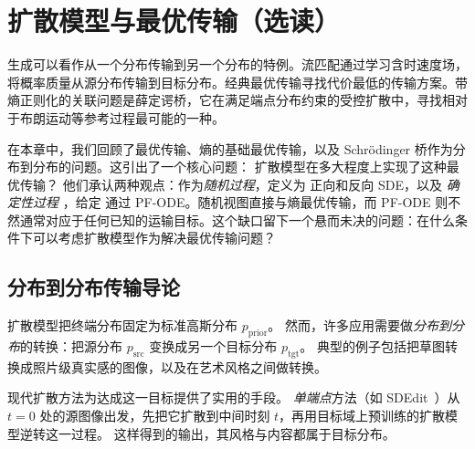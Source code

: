 \chapter{扩散模型与最优传输（选读）}\label{ch:ot-eot}


生成可以看作从一个分布传输到另一个分布的特例。流匹配通过学习含时速度场，将概率质量从源分布传输到目标分布。经典最优传输寻找代价最低的传输方案。带熵正则化的关联问题是薛定谔桥，它在满足端点分布约束的受控扩散中，寻找相对于布朗运动等参考过程最可能的一种。

在本章中，我们回顾了最优传输、熵的基础最优传输，以及 Schr\"odinger 桥作为分布到分布的问题。这引出了一个核心问题：
扩散模型在多大程度上实现了这种最优传输？
他们承认两种观点：作为\emph{随机过程}，定义为
正向和反向 SDE，以及 \emph{ 确定性过程 }，给定
通过 PF-ODE。随机视图直接与熵最优传输，而 PF-ODE 则不然通常对应于任何已知的运输目标。这个缺口留下一个悬而未决的问题：在什么条件下可以考虑扩散模型作为解决最优传输问题？



\section{分布到分布传输导论}
扩散模型把终端分布固定为标准高斯分布 $p_{\mathrm{prior}}$。
然而，许多应用需要做\emph{分布到分布}的转换：把源分布 $p_{\mathrm{src}}$ 变换成另一个目标分布 $p_{\mathrm{tgt}}$。
典型的例子包括把草图转换成照片级真实感的图像，以及在艺术风格之间做转换。

现代扩散方法为达成这一目标提供了实用的手段。
\emph{单端点}方法（如 SDEdit~\citep{meng2021sdedit}）从 $t=0$ 处的源图像出发，先把它扩散到中间时刻 $t$，再用目标域上预训练的扩散模型逆转这一过程。
这样得到的输出，其风格与内容都属于目标分布。

